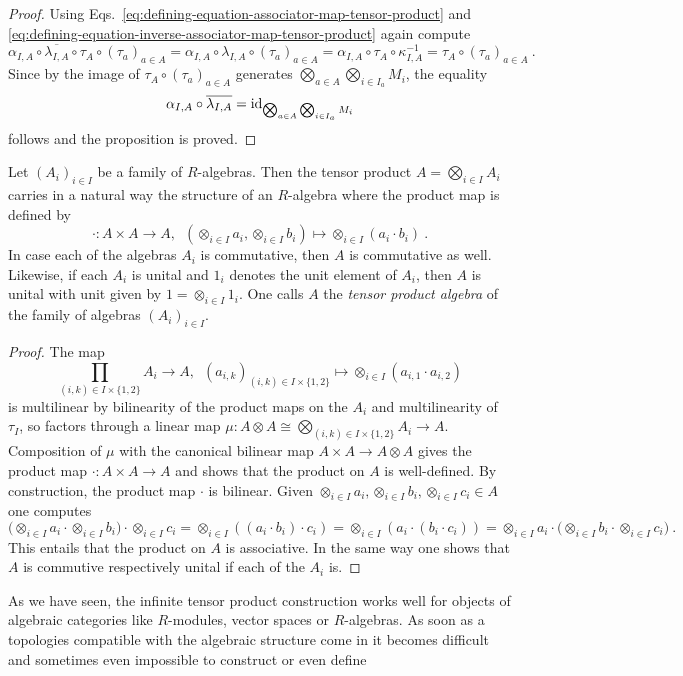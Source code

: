 \begin{proof}
  Using Eqs.~\eqref{eq:defining-equation-associator-map-tensor-product} and
  \eqref{eq:defining-equation-inverse-associator-map-tensor-product} again compute
  \[
    \alpha_{I,A} \circ\overline{\lambda_{I,A}} \circ \tau_A \circ (\tau_a)_{a\in A} =
    \alpha_{I,A} \circ \lambda_{I,A} \circ (\tau_a)_{a\in A} = \alpha_{I,A}\circ\tau_A\circ \kappa_{I,A}^{-1}
    =  \tau_A \circ (\tau_a)_{a\in A} \ .    
  \]
  Since by 
  the image of
  $\tau_A \circ (\tau_a)_{a\in A}$ generates $\bigotimes_{a \in A}  \bigotimes_{i \in I_a} M_i$,  the equality
  \[ \alpha_{I,A} \circ\overline{\lambda_{I,A}}=\mathrm{id}_{\bigotimes_{a \in A}  \bigotimes_{i \in I_a} M_i} \]
  follows and the proposition is proved.
\end{proof}

\begin{propanddef}
  Let $(A_i)_{i\in I}$ be a family of $R$-algebras. Then the tensor product
  $A = \bigotimes_{i\in I} A_i$ carries in a natural way the structure of an
  $R$-algebra where the product map is defined by
  \[
    \cdot :  A \times A \to A , \enspace
    (\otimes_{i\in I} a_i , \otimes_{i\in I} b_i)\mapsto
    \otimes_{i\in I} (a_i\cdot b_i) \ .
  \]
  In case each of the algebras $A_i$ is commutative, then $A$ is commutative
  as well.
  Likewise, if each $A_i$ is unital and $1_i$ denotes the unit element of
  $A_i$, then $A$ is unital with unit given by $1 = \otimes_{i\in I} 1_i$.
  One calls $A$ the \emph{tensor product algebra} of the family of algebras
  $(A_i)_{i\in I}$.
\end{propanddef}

\begin{proof}
  The map
  \[
    \prod_{(i,k)\in I \times \{ 1,2\}} A_i \to A,\enspace
    (a_{i,k})_{(i,k) \in I\times \{1,2\}} \mapsto\otimes_{i\in I}(a_{i,1}\cdot a_{i,2})
  \]
  is multilinear by bilinearity of the product maps on the $A_i$ and multilinearity of $\tau_I$,
  so factors through a linear map
  $\mu: A \otimes A \cong \bigotimes_{(i,k)\in I\times \{1,2\}} A_i \to A$. Composition of
  $\mu$ with the canonical bilinear map $A \times A \to A\otimes A$ gives the product map
  $\cdot : A \times A\to A$
  and shows that the product on $A$ is well-defined. By construction, the product map $\cdot$
  is bilinear. Given $\otimes_{i\in I} a_i, \otimes_{i\in I} b_i, \otimes_{i\in I} c_i \in A$ one
  computes
  \[
    \big( \otimes_{i\in I} a_i \cdot \otimes_{i\in I} b_i \big) \cdot \otimes_{i\in I} c_i
    = \otimes_{i\in I} ((a_i\cdot b_i)\cdot c_i) =
    \otimes_{i\in I} (a_i\cdot( b_i\cdot c_i)) =
    \otimes_{i\in I} a_i \cdot \big( \otimes_{i\in I} b_i  \cdot \otimes_{i\in I} c_i\big) \ .
  \]
  This entails that the product on $A$ is associative. In the same way one shows
  that $A$ is commutive respectively unital if each of the $A_i$ is. 
\end{proof}

\para
As we have seen, the infinite tensor product construction works well for objects of
algebraic categories like $R$-modules, vector spaces or $R$-algebras. As soon as
a topologies compatible with the algebraic structure come in it becomes difficult and
sometimes even impossible to construct or even define 
